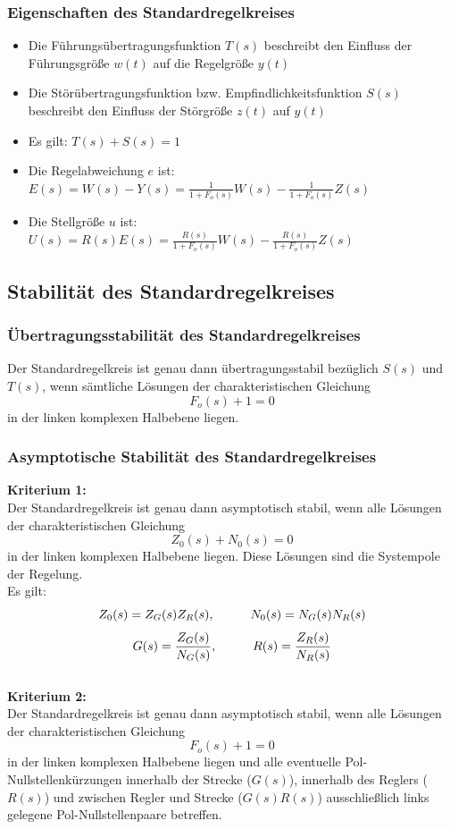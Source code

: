 \documentclass[10pt,a4paper]{article}
\newcommand{\tab}[1][1]{\hspace*{#1cm}}
\begin{document}
\subsubsection{Eigenschaften des Standardregelkreises}
\begin{itemize}
	\item Die Führungsübertragungsfunktion $T(s)$ beschreibt den Einfluss der Führungsgröße $w(t)$ auf die Regelgröße $y(t)$
	\item Die Störübertragungsfunktion bzw. Empfindlichkeitsfunktion $S(s)$ beschreibt den Einfluss der Störgröße $z(t)$ auf $y(t)$
	\item Es gilt: $T(s) + S(s) = 1$
	\item Die Regelabweichung $e$ ist: $E(s) = W(s) - Y(s) = \frac{1}{1 + F_o(s)}W(s) - \frac{1}{1 + F_o(s)} Z(s)$
	\item Die Stellgröße $u$ ist: $U(s) = R(s)E(s) = \frac{R(s)}{1 + F_o(s)}W(s) - \frac{R(s)}{1 + F_o(s)} Z(s)$
\end{itemize}

\subsection{Stabilität des Standardregelkreises}
\subsubsection{Übertragungsstabilität des Standardregelkreises}
Der Standardregelkreis ist genau dann übertragungsstabil bezüglich $S(s)$ und $T(s)$, wenn sämtliche Lösungen der charakteristischen Gleichung 
$$
	F_o(s) + 1 = 0
$$
in der linken komplexen Halbebene liegen.

\subsubsection{Asymptotische Stabilität des Standardregelkreises}
\textbf{Kriterium 1:} \\
Der Standardregelkreis ist genau dann asymptotisch stabil, wenn alle Lösungen der charakteristischen Gleichung 
$$
	Z_0(s) + N_0(s) = 0
$$
in der linken  komplexen Halbebene liegen. Diese Lösungen sind die Systempole der Regelung. \\
Es gilt: 
$$
	Z_0(s) = Z_G(s)Z_R(s), \tab N_0(s) = N_G(s)N_R(s)
$$
$$
	G(s) = \frac{Z_G(s)}{N_G(s)}, \tab R(s) = \frac{Z_R(s)}{N_R(s)}
$$ \\

\textbf{Kriterium 2:} \\
Der Standardregelkreis ist genau dann asymptotisch stabil, wenn alle Lösungen der charakteristischen Gleichung
$$
	F_o(s) + 1 = 0
$$
in der linken komplexen Halbebene liegen und alle eventuelle Pol-Nullstellenkürzungen innerhalb der Strecke ($G(s)$), innerhalb des Reglers ($R(s)$) und zwischen Regler und Strecke ($G(s)R(s)$) ausschließlich links gelegene Pol-Nullstellenpaare betreffen.
\end{document}
